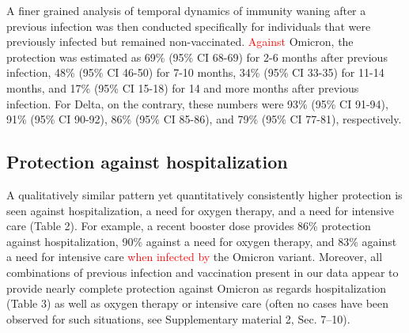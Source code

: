 \documentclass[a4paper,12pt]{article}
\newcommand{\inputtable}[1]{}
\newcommand{\inputtable}[1]{}
\def\tabHOIalone{2}
\def\tabHinteractions{3}
\newcommand{\new}[1]{\textcolor{red}{#1}}
\begin{document}
\inputtable{smid_protection_against_omicron_tab1.inc}

A finer grained analysis of temporal dynamics of immunity waning after a previous infection was then conducted specifically for individuals that were previously infected but remained non-vaccinated. \new{Against} Omicron, the protection was estimated as 69\% (95\% CI 68-69) for 2-6 months after previous infection,  48\% (95\% CI 46-50) for 7-10 months, 34\% (95\% CI 33-35) for 11-14 months, and 17\% (95\% CI 15-18) for 14 and more months after previous infection. For Delta, on the contrary, these numbers were 93\% (95\% CI 91-94), 91\% (95\% CI 90-92), 86\% (95\% CI 85-86), and 79\% (95\% CI 77-81), respectively.

\subsection*{Protection against hospitalization}

A qualitatively similar pattern yet quantitatively consistently higher protection is seen against hospitalization, a need for oxygen therapy, and a need for intensive care (Table \tabHOIalone). 
For example, a recent booster dose provides 86\% protection against hospitalization, 90\% against a need for oxygen therapy, and 83\% against a need for intensive care \new{when infected by} the Omicron variant. Moreover, all combinations of previous infection and vaccination present in our data appear to provide nearly complete protection against Omicron as regards hospitalization (Table \tabHinteractions) as well as oxygen therapy or intensive care (often no cases have been observed for such situations, see Supplementary material 2, Sec. 7--10).

\inputtable{smid_protection_against_omicron_tab2.inc}

\inputtable{smid_protection_against_omicron_tab3.inc}

\inputtable{smid_protection_against_omicron_tab4.inc}
\end{document}
